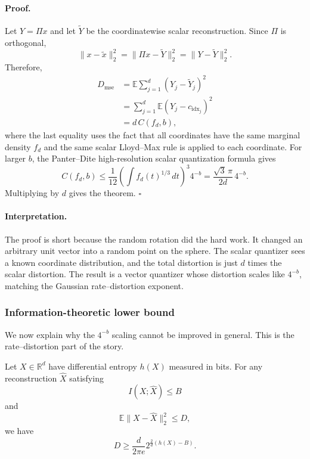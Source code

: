 \paragraph{Proof.}
Let $Y=\Pi x$ and let $\widetilde Y$ be the coordinatewise scalar reconstruction.
Since $\Pi$ is orthogonal,
\begin{equation}
    \|x-\widetilde x\|_2^2
    =\|\Pi x-\widetilde Y\|_2^2
    =\|Y-\widetilde Y\|_2^2.
\end{equation}
Therefore,
\begin{align}
    D_{\mathrm{mse}}
    &=\mathbb E\sum_{j=1}^{d}(Y_j-\widetilde Y_j)^2\\
    &=\sum_{j=1}^{d}\mathbb E(Y_j-c_{\mathrm{idx}_j})^2\\
    &=d\,C(f_d,b),
\end{align}
where the last equality uses the fact that all coordinates have the same marginal density $f_d$ and the same scalar Lloyd--Max rule is applied to each coordinate.
For larger $b$, the Panter--Dite high-resolution scalar quantization formula gives
\begin{equation}
    C(f_d,b)
    \le
    \frac1{12}
    \left(\int f_d(t)^{1/3}\,dt\right)^3 4^{-b}
    =
    \frac{\sqrt 3\,\pi}{2d}\,4^{-b}.
\end{equation}
Multiplying by $d$ gives the theorem.
\hfill$\square$

\paragraph{Interpretation.}
The proof is short because the random rotation did the hard work.
It changed an arbitrary unit vector into a random point on the sphere.
The scalar quantizer sees a known coordinate distribution, and the total distortion is just $d$ times the scalar distortion.
The result is a vector quantizer whose distortion scales like $4^{-b}$, matching the Gaussian rate--distortion exponent.

\subsubsection*{Information-theoretic lower bound}

We now explain why the $4^{-b}$ scaling cannot be improved in general.
This is the rate--distortion part of the story.

\begin{lemma}
\label{lem:tq-slb}
Let $X\in\mathbb R^d$ have differential entropy $h(X)$ measured in bits.
For any reconstruction $\widehat X$ satisfying
\begin{equation}
    I(X;\widehat X)\le B
\end{equation}
and
\begin{equation}
    \mathbb E\|X-\widehat X\|_2^2\le D,
\end{equation}
we have
\begin{equation}
    D\ge
    \frac{d}{2\pi e}
    2^{\frac{2}{d}(h(X)-B)}.
\end{equation}
\end{lemma}

